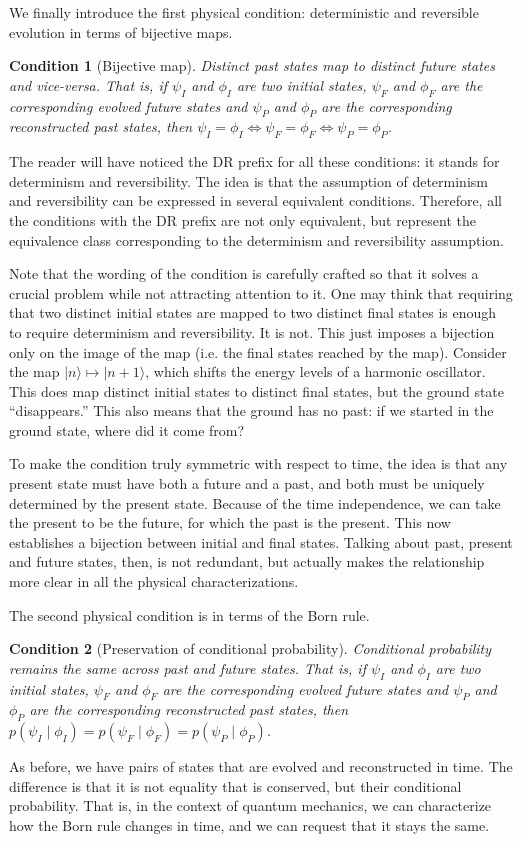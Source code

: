 \documentclass[entropy,article,submit,moreauthors]{Definitions/mdpi}
\newtheorem{condth}{Condition}
\renewcommand*{\thecondth}{\Roman{condth}}
\newenvironment{condition}[2][]{\renewcommand{\thecondth}{#2}\begin{condth}[#1]\label{#2}}{\end{condth}\renewcommand{\thecondth}{\Roman{condth}}}
\def\>{\rangle}
\begin{document}
We finally introduce the first physical condition: deterministic and reversible evolution in terms of bijective maps.
\begin{condition}[Bijective map]{DR-EV}
	Distinct past states map to distinct future states and vice-versa. That is, if $\psi_I$ and $\phi_I$ are two initial states, $\psi_F$ and $\phi_F$ are the corresponding evolved future states and $\psi_P$ and $\phi_P$ are the corresponding reconstructed past states, then $\psi_I = \phi_I \iff \psi_F = \phi_F \iff \psi_P = \phi_P$.
\end{condition}
The reader will have noticed the DR prefix for all these conditions: it stands for determinism and reversibility. The idea is that the assumption of determinism and reversibility can be expressed in several equivalent conditions. Therefore, all the conditions with the DR prefix are not only equivalent, but represent the equivalence class corresponding to the determinism and reversibility assumption.

Note that the wording of the condition is carefully crafted so that it solves a crucial problem while not attracting attention to it. One may think that requiring that two distinct initial states are mapped to two distinct final states is enough to require determinism and reversibility. It is not. This just imposes a bijection only on the image of the map (i.e. the final states reached by the map). Consider the map $|n\> \mapsto |n+1\>$, which shifts the energy levels of a harmonic oscillator. This does map distinct initial states to distinct final states, but the ground state ``disappears.'' This also means that the ground has no past: if we started in the ground state, where did it come from?

To make the condition truly symmetric with respect to time, the idea is that any present state must have both a future and a past, and both must be uniquely determined by the present state. Because of the time independence, we can take the present to be the future, for which the past is the present. This now establishes a bijection between initial and final states. Talking about past, present and future states, then, is not redundant, but actually makes the relationship more clear in all the physical characterizations.

The second physical condition is in terms of the Born rule.
\begin{condition}[Preservation of conditional probability]{DR-PROB}
	Conditional probability remains the same across past and future states. That is, if $\psi_I$ and $\phi_I$ are two initial states, $\psi_F$ and $\phi_F$ are the corresponding evolved future states and $\psi_P$ and $\phi_P$ are the corresponding reconstructed past states, then $p(\psi_I \mid \phi_I) = p(\psi_F \mid \phi_F) = p(\psi_P \mid \phi_P)$.
\end{condition}
As before, we have pairs of states that are evolved and reconstructed in time. The difference is that it is not equality that is conserved, but their conditional probability. That is, in the context of quantum mechanics, we can characterize how the Born rule changes in time, and we can request that it stays the same.
\end{document}
